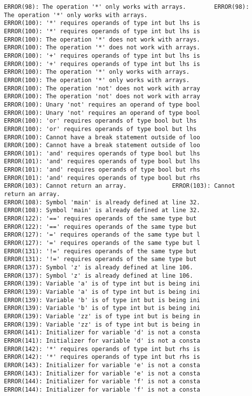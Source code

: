 \documentclass[12pt]{book}
\begin{document}
\begin{lstlisting}
ERROR(98): The operation '*' only works with arrays.		ERROR(98): The operation '*' only works with arrays.
ERROR(100): '*' requires operands of type int but lhs is	ERROR(100): '*' requires operands of type int but lhs is
ERROR(100): The operation '*' does not work with arrays.	ERROR(100): The operation '*' does not work with arrays.
ERROR(100): '+' requires operands of type int but lhs is	ERROR(100): '+' requires operands of type int but lhs is
ERROR(100): The operation '*' only works with arrays.		ERROR(100): The operation '*' only works with arrays.
ERROR(100): The operation 'not' does not work with array	ERROR(100): The operation 'not' does not work with array
ERROR(100): Unary 'not' requires an operand of type bool	ERROR(100): Unary 'not' requires an operand of type bool
ERROR(100): 'or' requires operands of type bool but lhs 	ERROR(100): 'or' requires operands of type bool but lhs 
ERROR(100): Cannot have a break statement outside of loo	ERROR(100): Cannot have a break statement outside of loo
ERROR(101): 'and' requires operands of type bool but lhs	ERROR(101): 'and' requires operands of type bool but lhs
ERROR(101): 'and' requires operands of type bool but rhs	ERROR(101): 'and' requires operands of type bool but rhs
ERROR(103): Cannot return an array.				ERROR(103): Cannot return an array.
ERROR(108): Symbol 'main' is already defined at line 32.	ERROR(108): Symbol 'main' is already defined at line 32.
ERROR(122): '==' requires operands of the same type but 	ERROR(122): '==' requires operands of the same type but 
ERROR(127): '=' requires operands of the same type but l	ERROR(127): '=' requires operands of the same type but l
ERROR(131): '!=' requires operands of the same type but 	ERROR(131): '!=' requires operands of the same type but 
ERROR(137): Symbol 'z' is already defined at line 106.		ERROR(137): Symbol 'z' is already defined at line 106.
ERROR(139): Variable 'a' is of type int but is being ini	ERROR(139): Variable 'a' is of type int but is being ini
ERROR(139): Variable 'b' is of type int but is being ini	ERROR(139): Variable 'b' is of type int but is being ini
ERROR(139): Variable 'zz' is of type int but is being in	ERROR(139): Variable 'zz' is of type int but is being in
ERROR(141): Initializer for variable 'd' is not a consta	ERROR(141): Initializer for variable 'd' is not a consta
ERROR(142): '*' requires operands of type int but rhs is	ERROR(142): '*' requires operands of type int but rhs is
ERROR(143): Initializer for variable 'e' is not a consta	ERROR(143): Initializer for variable 'e' is not a consta
ERROR(144): Initializer for variable 'f' is not a consta	ERROR(144): Initializer for variable 'f' is not a consta

\end{lstlisting}
\end{document}
